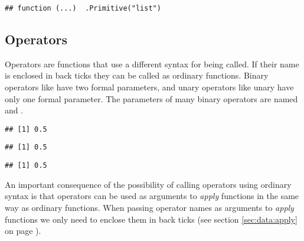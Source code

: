 \documentclass[krantz2]{krantz}\usepackage{knitr}
\begin{document}
\begin{knitrout}\footnotesize
{}\color{fgcolor}\begin{kframe}
\begin{alltt}
\end{alltt}
\begin{verbatim}
## function (...)  .Primitive("list")
\end{verbatim}
\end{kframe}
\end{knitrout}

\subsection{Operators}\label{sec:operator:functions}

Operators are functions that use a different syntax for being called. If their name is enclosed in back ticks they can be called as ordinary functions. Binary operators like \code{+} have two formal parameters, and unary operators like unary \code{-} have only one formal parameter. The parameters of many binary \Rlang operators are named  and .

\begin{knitrout}\footnotesize
{}\color{fgcolor}\begin{kframe}
\begin{alltt}
 \hlopt{/} 
\end{alltt}
\begin{verbatim}
## [1] 0.5
\end{verbatim}
\begin{alltt}
\hlstd{(} \hlstd{,} \hlstd{)}
\end{alltt}
\begin{verbatim}
## [1] 0.5
\end{verbatim}
\begin{alltt}
\hlstd{(} \hlstd{=}  \hlstd{,}  \hlstd{=} \hlstd{)}
\end{alltt}
\begin{verbatim}
## [1] 0.5
\end{verbatim}
\end{kframe}
\end{knitrout}

An important consequence of the possibility of calling operators using ordinary syntax is that operators can be used as arguments to \emph{apply} functions in the same way as ordinary functions. When passing operator names as arguments to \emph{apply} functions we only need to enclose them in back ticks (see section \ref{sec:data:apply} on page \pageref{sec:data:apply}).
\end{document}
